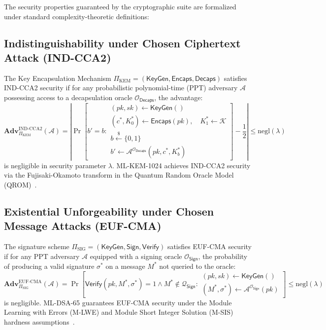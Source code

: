 The security properties guaranteed by the cryptographic suite are formalized under standard complexity-theoretic definitions:

\subsection{Indistinguishability under Chosen Ciphertext Attack (IND-CCA2)}
The Key Encapsulation Mechanism $\Pi_{\text{KEM}} = (\mathsf{KeyGen}, \mathsf{Encaps}, \mathsf{Decaps})$ satisfies IND-CCA2 security if for any probabilistic polynomial-time (PPT) adversary $\mathcal{A}$ possessing access to a decapsulation oracle $\mathcal{O}_{\mathsf{Decaps}}$, the advantage:
\begin{equation}
\mathbf{Adv}_{\Pi_{\text{KEM}}}^{\text{IND-CCA2}}(\mathcal{A}) = \left| \Pr\left[b' = b : 
\begin{array}{l}
(pk, sk) \leftarrow \mathsf{KeyGen}() \\
(c^*, K_0^*) \leftarrow \mathsf{Encaps}(pk), \quad K_1^* \leftarrow \mathcal{K} \\
b \stackrel{\$}{\leftarrow} \{0, 1\} \\
b' \leftarrow \mathcal{A}^{\mathcal{O}_{\mathsf{Decaps}}}(pk, c^*, K_b^*)
\end{array}
\right] - \frac{1}{2} \right| \le \text{negl}(\lambda)
\end{equation}
is negligible in security parameter $\lambda$. ML-KEM-1024 achieves IND-CCA2 security via the Fujisaki-Okamoto transform in the Quantum Random Oracle Model (QROM)~\cite{bos2018crystals,nist_fips_203}.

\subsection{Existential Unforgeability under Chosen Message Attacks (EUF-CMA)}
The signature scheme $\Pi_{\text{SIG}} = (\mathsf{KeyGen}, \mathsf{Sign}, \mathsf{Verify})$ satisfies EUF-CMA security if for any PPT adversary $\mathcal{A}$ equipped with a signing oracle $\mathcal{O}_{\mathsf{Sign}}$, the probability of producing a valid signature $\sigma^*$ on a message $M^*$ not queried to the oracle:
\begin{equation}
\mathbf{Adv}_{\Pi_{\text{SIG}}}^{\text{EUF-CMA}}(\mathcal{A}) = \Pr\left[\mathsf{Verify}(pk, M^*, \sigma^*) = 1 \wedge M^* \notin \mathcal{Q}_{\mathsf{Sign}} :
\begin{array}{l}
(pk, sk) \leftarrow \mathsf{KeyGen}() \\
(M^*, \sigma^*) \leftarrow \mathcal{A}^{\mathcal{O}_{\mathsf{Sign}}}(pk)
\end{array}
\right] \le \text{negl}(\lambda)
\end{equation}
is negligible. ML-DSA-65 guarantees EUF-CMA security under the Module Learning with Errors (M-LWE) and Module Short Integer Solution (M-SIS) hardness assumptions~\cite{ducas2018crystals,nist_fips_204}.

